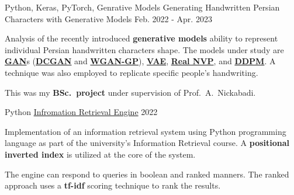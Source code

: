

\begin{cventries}

  \cventry
    {Python, Keras, PyTorch, Genrative Models} %
    {Generating Handwritten Persian Characters with Generative Models} %
    {} %
    {Feb. 2022 - Apr. 2023} %
    {
      \begin{cvitems} %
      	\item {Analysis of the recently introduced \textbf{generative models} ability to represent individual Persian handwritten characters shape. The models under study are \href{https://arxiv.org/abs/1406.2661}{\textbf{GAN}}s (\href{https://arxiv.org/abs/1511.06434}{\textbf{DCGAN}} and \href{https://arxiv.org/abs/1704.00028}{\textbf{WGAN-GP}}), \href{https://arxiv.org/abs/1312.6114}{\textbf{VAE}}, \href{https://arxiv.org/abs/1605.08803}{\textbf{Real NVP}}, and \href{https://arxiv.org/abs/2006.11239}{\textbf{DDPM}}. A technique was also employed to replicate specific people's handwriting.}
      	\item {This was my \textbf{BSc.~project} under supervision of Prof.~A.~Nickabadi.}
      \end{cvitems}
    }

  \cventry
    {Python} %
    {\href{https://github.com/radinshayanfar/AUT-IR}{Infromation Retrieval Engine}} %
    {} %
    {2022} %
    {
      \begin{cvitems} %
      	\item {Implementation of an information retrieval system using Python programming language as part of the university's Information Retrieval course. A \textbf{positional inverted index} is utilized at the core of the system.}
      	\item {The engine can respond to queries in boolean and ranked manners. The ranked approach uses a \textbf{tf-idf} scoring technique to rank the results.}
      \end{cvitems}
    }


\end{cventries}
